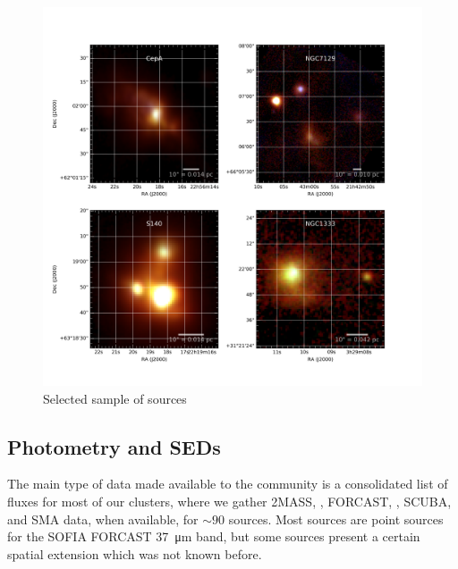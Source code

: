 \begin{figure}[!h]
\begin{center}
\includegraphics[width=\textwidth]{Figures/RGBmosaic.png}
\vspace{-1cm}
\caption[RGB images of select sample of sources]{Selected sample of sources}
\label{fig:varietySources}
\end{center}
\end{figure}

\subsection{Photometry and SEDs}

The main type of data made available to the community is a consolidated list of fluxes for most of our clusters, where we gather 2MASS, \Spitzer, FORCAST, \Herschel, SCUBA, and SMA data, when available, for $\sim 90$ sources. Most sources are point sources for the SOFIA FORCAST \SI{37}{\um} band, but some sources present a certain spatial extension which was not known before. 


